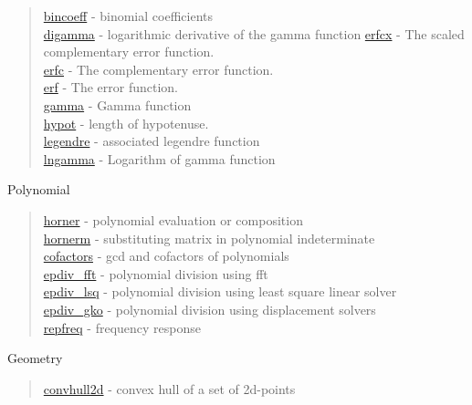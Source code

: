\begin{quote}
\noindent
\hyperlink{bincoeff}{bincoeff} - {binomial coefficients}\\
\hyperlink{digamma}{digamma} - {logarithmic derivative of the gamma function}
\hyperlink{erfcx}{erfcx} - {The scaled complementary error function.}\\
\hyperlink{erfc}{erfc} - {The complementary error function.}\\
\hyperlink{erf}{erf} - {The error function.}\\
\hyperlink{gamma}{gamma} - {Gamma function}\\
\hyperlink{hypot}{hypot} - {length of hypotenuse.}\\
\hyperlink{legendre}{legendre} - associated legendre function\\
\hyperlink{lngamma}{lngamma} - {Logarithm of gamma function}\\
\end{quote}

Polynomial

\begin{quote}
\noindent
\hyperlink{horner}{horner} - polynomial evaluation or composition \\
\hyperlink{hornerm}{hornerm} - substituting matrix in polynomial indeterminate \\
\hyperlink{cofactors}{cofactors} - gcd and cofactors of polynomials \\
\hyperlink{epdiv_fft}{epdiv\_fft} - {polynomial division using fft}\\
\hyperlink{epdiv_lsq}{epdiv\_lsq} - {polynomial division using least square linear solver}\\
\hyperlink{epdiv_gko}{epdiv\_gko} - { polynomial division using displacement solvers}\\
\hyperlink{repfreq}{repfreq} - {frequency response} \\
\end{quote}


Geometry

\begin{quote}
\noindent
\hyperlink{convhull2d}{convhull2d} - {convex hull of a set of 2d-points}\\
\end{quote}


























